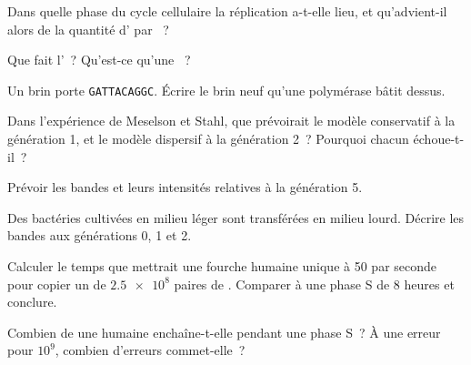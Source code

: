 \begin{exercise}[$\star$]\label{exo:g11:dna-replication:3}
Dans quelle phase du cycle cellulaire la réplication a-t-elle lieu, et
qu'advient-il alors de la quantité d' par ~?
\end{exercise}

\begin{exercise}[$\star$]\label{exo:g11:dna-replication:4}
Que fait l'~? Qu'est-ce qu'une ~?
\end{exercise}

\begin{exercise}[$\star$]\label{exo:g11:dna-replication:5}
Un brin porte \texttt{GATTACAGGC}. Écrire le brin neuf qu'une
polymérase bâtit dessus.
\end{exercise}

\begin{exercise}[$\star\star$]\label{exo:g11:dna-replication:6}
Dans l'expérience de Meselson et Stahl, que prévoirait le modèle
conservatif à la génération 1, et le modèle dispersif à la génération
2~? Pourquoi chacun échoue-t-il~?
\end{exercise}

\begin{exercise}[$\star\star$]\label{exo:g11:dna-replication:7}
Prévoir les bandes et leurs intensités relatives à la génération 5.
\end{exercise}

\begin{exercise}[$\star\star$]\label{exo:g11:dna-replication:8}
Des bactéries cultivées en milieu léger sont transférées en milieu
lourd. Décrire les bandes aux générations 0, 1 et 2.
\end{exercise}

\begin{exercise}[$\star\star$]\label{exo:g11:dna-replication:9}
Calculer le temps que mettrait une fourche humaine unique à 50
 par seconde pour copier un  de $\num{2.5e8}$
paires de . Comparer à une phase S de 8 heures et conclure.
\end{exercise}

\begin{exercise}[$\star\star$]\label{exo:g11:dna-replication:10}
Combien de  une  humaine enchaîne-t-elle pendant une
phase S~? À une erreur pour $10^9$, combien d'erreurs commet-elle~?
\end{exercise}

